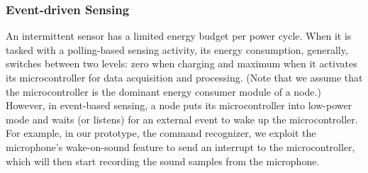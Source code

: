 \subsubsection{Event-driven Sensing}
%
An intermittent sensor has a limited energy budget per power cycle. When it is tasked with a polling-based sensing activity, its energy consumption, generally, switches between two levels: zero when charging and maximum when it activates its microcontroller for data acquisition and processing. 
(Note that we assume that the microcontroller is the dominant energy consumer module of a node.) However, in event-based sensing, a node puts its microcontroller into low-power mode and waits (or listens) for an external event to wake up the microcontroller. For example, in our prototype, the command recognizer, we exploit the microphone's wake-on-sound feature to send an interrupt to the microcontroller, which will then start recording the sound samples from the microphone. 
%
